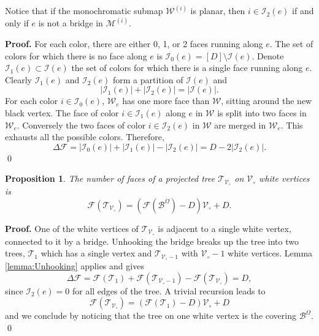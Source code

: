 \documentclass[aps,prd,10pt,notitlepage,nofootinbib,superscriptaddress,showkeys,showpacs]{revtex4-1}
\newtheorem{prop}{Proposition}
\begin{document}
Notice that if the monochromatic submap ${\mathcal{W}}^{(i)}$ is planar, then $i\in{\mathcal{I}}_2(e)$ if and only if $e$ is not a bridge in ${\mathcal{M}}^{(i)}$.

{\bf Proof.} For each color, there are either 0, 1, or 2 faces running along $e$. The set of colors for which there is no face along $e$ is ${\mathcal{I}}_0(e) = [D]\setminus{\mathcal{I}}(e)$. Denote ${\mathcal{I}}_1(e)\subset {\mathcal{I}}(e)$ the set of colors for which there is a single face running along $e$. Clearly ${\mathcal{I}}_1(e)$ and ${\mathcal{I}}_2(e)$ form a partition of ${\mathcal{I}}(e)$ and 
\begin{equation}
|{\mathcal{I}}_1(e)| + |{\mathcal{I}}_2(e)| = |{\mathcal{I}}(e)|.
\end{equation}
For each color $i\in{\mathcal{I}}_0(e)$, ${\mathcal{W}}_e$ has one more face than ${\mathcal{W}}$, sitting around the new black vertex. The face of color $i\in{\mathcal{I}}_1(e)$ along $e$ in ${\mathcal{W}}$ is split into two faces in ${\mathcal{W}}_e$. Conversely the two faces of color $i\in {\mathcal{I}}_2(e)$ in ${\mathcal{W}}$ are merged in ${\mathcal{W}}_e$. This exhausts all the possible colors. Therefore,
\begin{equation}
\Delta{\mathcal{F}} = |{\mathcal{I}}_0(e)| + |{\mathcal{I}}_1(e)| - |{\mathcal{I}}_2(e)| = D - 2|{\mathcal{I}}_2(e)|.
\end{equation}
\qed

\begin{prop} \label{prop:Trees}
The number of faces of a projected tree ${\mathcal{T}}_{{\mathcal{V}}_\circ}$ on ${\mathcal{V}}_\circ$ white vertices is
\begin{equation}
{\mathcal{F}}({\mathcal{T}}_{{\mathcal{V}}_\circ}) = ({\mathcal{F}}({\mathcal{B}}^\Omega) - D){\mathcal{V}}_\circ + D.
\end{equation}
\end{prop}

{\bf Proof.} One of the white vertices of ${\mathcal{T}}_{{\mathcal{V}}_\circ}$ is adjacent to a single white vertex, connected to it by a bridge. Unhooking the bridge breaks up the tree into two trees, ${\mathcal{T}}_1$ which has a single vertex and ${\mathcal{T}}_{{\mathcal{V}}_\circ-1}$ with ${\mathcal{V}}_\circ - 1$ white vertices. Lemma \ref{lemma:Unhooking} applies and gives
\begin{equation}
\Delta{\mathcal{F}} = {\mathcal{F}}({\mathcal{T}}_1) + {\mathcal{F}}({\mathcal{T}}_{{\mathcal{V}}_\circ-1}) - {\mathcal{F}}({\mathcal{T}}_{{\mathcal{V}}_\circ}) = D,
\end{equation}
since ${\mathcal{I}}_2(e) = 0$ for all edges of the tree. A trivial recursion leads to
\begin{equation}
{\mathcal{F}}({\mathcal{T}}_{{\mathcal{V}}_\circ}) = ({\mathcal{F}}({\mathcal{T}}_1) - D){\mathcal{V}}_\circ + D
\end{equation}
and we conclude by noticing that the tree on one white vertex is the covering ${\mathcal{B}}^{\Omega}$.
\qed
\end{document}

